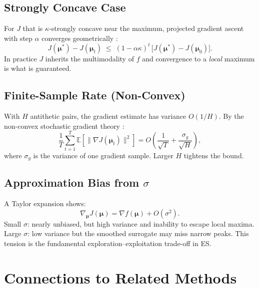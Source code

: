 \documentclass[12pt, a4paper]{article}
\newcommand{\bmu}{\boldsymbol{\mu}}
\newcommand{\EE}{\mathbb{E}}
\begin{document}
\subsection{Strongly Concave Case}

For $J$ that is $\kappa$-strongly concave near the maximum, projected
gradient ascent with step $\alpha$ converges geometrically \cite{bubeck2015}:
\begin{equation}
  J(\bmu^*)-J(\bmu_t)
  \;\leq\;
  (1-\alpha\kappa)^t\,\bigl[J(\bmu^*)-J(\bmu_0)\bigr].
\end{equation}
In practice $J$ inherits the multimodality of $f$ and convergence to a
\emph{local} maximum is what is guaranteed.

\subsection{Finite-Sample Rate (Non-Convex)}

With $H$ antithetic pairs, the gradient estimate has variance $O(1/H)$.
By the non-convex stochastic gradient theory \cite{bottou2018}:
\begin{equation}
  \frac{1}{T}\sum_{t=1}^{T}
  \EE\!\left[\bigl\|\nabla J(\bmu_t)\bigr\|^2\right]
  = O\!\left(\frac{1}{\sqrt{T}}+\frac{\sigma_g}{\sqrt{H}}\right),
\end{equation}
where $\sigma_g$ is the variance of one gradient sample.
Larger $H$ tightens the bound.

\subsection{Approximation Bias from $\sigma$}

A Taylor expansion \cite{salimans2017} shows:
\begin{equation}
  \nabla_{\bmu}J(\bmu) = \nabla f(\bmu) + O(\sigma^2).
\end{equation}
Small $\sigma$: nearly unbiased, but high variance and inability to
escape local maxima.
Large $\sigma$: low variance but the smoothed surrogate may miss narrow
peaks.
This tension is the fundamental exploration--exploitation trade-off in ES.

\section{Connections to Related Methods}
\label{sec:connections}
\end{document}
